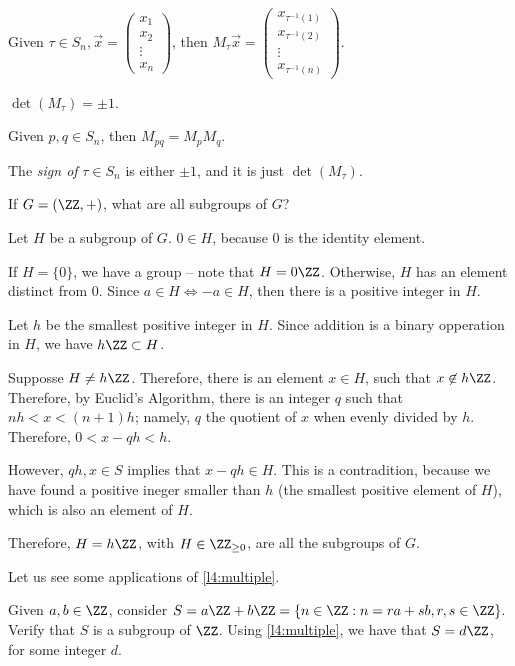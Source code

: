 \begin{thm}
	Given $\tau \in S_n, \vec{x} = \begin{pmatrix} x_1\\ x_2\\ \vdots\\ x_n \end{pmatrix}$, then $M_\tau \vec{x} = \begin{pmatrix} x_{\tau^{-1}(1)}\\ x_{\tau^{-1}(2)}\\ \vdots\\ x_{\tau^{-1}(n)} \end{pmatrix}$.
\end{thm}

\begin{thm} $\det(M_\tau) = \pm 1$.
\end{thm}

\begin{thm}
	Given $p, q \in S_n$, then  $M_{pq} = M_p M_q$.
\end{thm}

\begin{defn}
	The \emph{sign of} $\tau \in S_n$ is either $\pm 1$, and it is just $\det(M_\tau)$.
\end{defn}

\begin{prob} \label{l4:multiple}
	If $G = (\ZZ, +)$, what are all subgroups of $G$?
\end{prob}

\begin{sol}
	Let $H$ be a subgroup of $G$. $0 \in H$, because $0$ is the identity element.

	If $H = \{0\}$, we have a group -- note that $H = 0\ZZ$. Otherwise, $H$ has an element distinct from $0$. Since $a \in H \iff -a \in H$, then there is a positive integer in $H$.
	
	Let $h$ be the smallest positive integer in $H$. Since addition is a binary opperation in $H$, we have $h\ZZ \subset H$.

	Supposse $H \neq h\ZZ$. Therefore, there is an element $x \in H$, such that $x \not \in h\ZZ$. Therefore, by Euclid's Algorithm, there is an integer $q$ such that $nh < x < (n+1)h$; namely, $q$ the quotient of $x$ when evenly divided by $h$. Therefore, $0 < x - qh < h$. 

	However, $qh, x \in S$ implies that $x - qh \in H$. This is a contradition, because we have found a positive ineger smaller than $h$ (the smallest positive element of $H$), which is also an element of $H$.

	Therefore, $H = h\ZZ$, with $H \in \ZZ_{\ge 0}$, are all the subgroups of $G$.
\end{sol}

Let us see some applications of \cref{l4:multiple}.

Given $a, b \in \ZZ$, consider $S = a\ZZ + b\ZZ = \{ n \in \ZZ : n = ra+sb, r, s \in \ZZ\}.$ Verify that $S$ is a subgroup of $\ZZ$. Using \cref{l4:multiple}, we have that $S = d\ZZ$, for some integer $d$.
